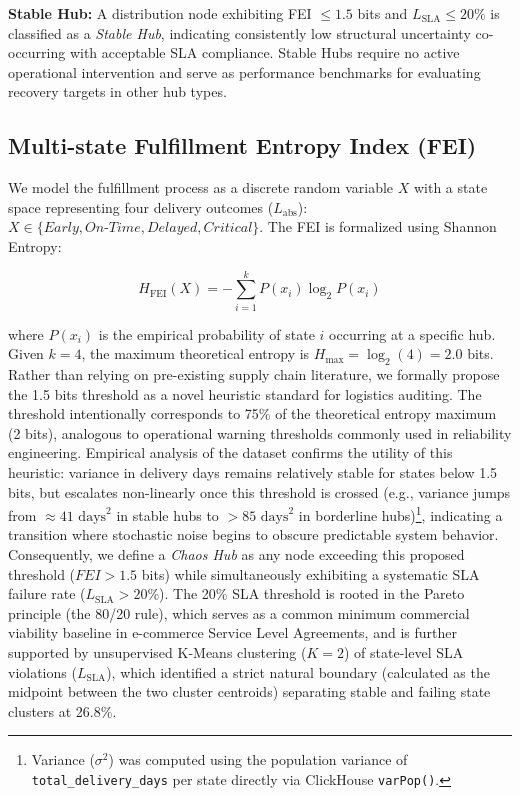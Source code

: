 \documentclass[conference]{IEEEtran}
\begin{document}
\textbf{Stable Hub:} A distribution node exhibiting FEI $\leq 1.5$ bits and $L_{\text{SLA}} \leq 20\%$ is classified as a \textit{Stable Hub}, indicating consistently low structural uncertainty co-occurring with acceptable SLA compliance. Stable Hubs require no active operational intervention and serve as performance benchmarks for evaluating recovery targets in other hub types.

\subsection{Multi-state Fulfillment Entropy Index (FEI)}
We model the fulfillment process as a discrete random variable $X$ with a state space representing four delivery outcomes ($L_{\text{abs}}$): $X \in \{Early, On\text{-}Time, Delayed, Critical\}$. The FEI is formalized using Shannon Entropy:

\begin{equation}
H_{\text{FEI}}(X) = - \sum_{i=1}^{k} P(x_i) \log_2 P(x_i)
\end{equation}

where $P(x_i)$ is the empirical probability of state $i$ occurring at a specific hub. Given $k=4$, the maximum theoretical entropy is $H_{\max} = \log_2(4) = 2.0$ bits. Rather than relying on pre-existing supply chain literature, we formally propose the 1.5 bits threshold as a novel heuristic standard for logistics auditing. The threshold intentionally corresponds to 75\% of the theoretical entropy maximum (2 bits), analogous to operational warning thresholds commonly used in reliability engineering. Empirical analysis of the dataset confirms the utility of this heuristic: variance in delivery days remains relatively stable for states below 1.5 bits, but escalates non-linearly once this threshold is crossed (e.g., variance jumps from $\approx 41\text{ days}^2$ in stable hubs to $> 85\text{ days}^2$ in borderline hubs)\footnote{Variance ($\sigma^2$) was computed using the population variance of \texttt{total\_delivery\_days} per state directly via ClickHouse \texttt{varPop()}.}, indicating a transition where stochastic noise begins to obscure predictable system behavior. Consequently, we define a \textit{Chaos Hub} as any node exceeding this proposed threshold ($FEI > 1.5$ bits) while simultaneously exhibiting a systematic SLA failure rate ($L_{\text{SLA}} > 20\%$). The 20\% SLA threshold is rooted in the Pareto principle (the 80/20 rule), which serves as a common minimum commercial viability baseline in e-commerce Service Level Agreements, and is further supported by unsupervised K-Means clustering ($K=2$) of state-level SLA violations ($L_{\text{SLA}}$), which identified a strict natural boundary (calculated as the midpoint between the two cluster centroids) separating stable and failing state clusters at 26.8\%.
\end{document}

